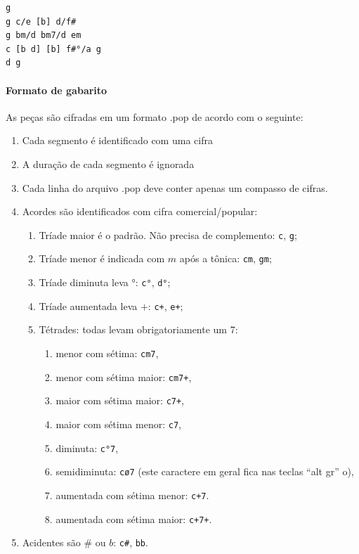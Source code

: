\documentclass[12pt,brazil]{book}
\begin{document}
\begin{verbatim}
g
g c/e [b] d/f#
g bm/d bm7/d em
c [b d] [b] f#°/a g
d g
\end{verbatim}

\paragraph{Formato de gabarito}
\label{sec:formato-de-gabarito}

As peças são cifradas em um formato .pop de acordo com o seguinte:

\begin{enumerate}
\item Cada segmento é identificado com uma cifra
\item A duração de cada segmento é ignorada
\item Cada linha do arquivo .pop deve conter apenas um compasso de
  cifras.
\item Acordes são identificados com cifra comercial/popular:
  \begin{enumerate}
  \item Tríade maior é o padrão. Não precisa de complemento:
    \texttt{c}, \texttt{g};
  \item Tríade menor é indicada com $m$ após a tônica: \texttt{cm},
    \texttt{gm};
  \item Tríade diminuta leva $°$: \texttt{c°}, \texttt{d°};
  \item Tríade aumentada leva $+$: \texttt{c+}, \texttt{e+};
  \item Tétrades: todas levam obrigatoriamente um 7:
    \begin{enumerate}
    \item menor com sétima: \texttt{cm7},
    \item menor com sétima maior: \texttt{cm7+},
    \item maior com sétima maior: \texttt{c7+},
    \item maior com sétima menor: \texttt{c7},
    \item diminuta: \texttt{c°7},
    \item semidiminuta: \texttt{cø7} (este caractere em geral fica nas
      teclas ``alt gr'' o),
    \item aumentada com sétima menor: \texttt{c+7}.
    \item aumentada com sétima maior: \texttt{c+7+}.
    \end{enumerate}
  \end{enumerate}
  \item Acidentes são $\#$ ou $b$: \texttt{c\#}, \texttt{bb}.

\end{enumerate}
\end{document}
